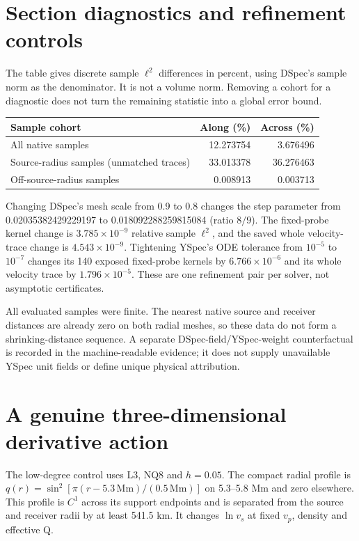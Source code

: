\documentclass[11pt,a4paper]{article}
\begin{document}
\section{Section diagnostics and refinement controls}
The table gives discrete sample $\ell^2$ differences in percent, using DSpec's sample norm as the denominator. It is not a volume norm. Removing a cohort for a diagnostic does not turn the remaining statistic into a global error bound.
\begin{center}\begin{tabular}{lrr}\toprule
Sample cohort & Along (\%) & Across (\%) \\\midrule
All native samples & 12.273754 & 3.676496 \\
Source-radius samples (unmatched traces) & 33.013378 & 36.276463 \\
Off-source-radius samples & 0.008913 & 0.003713 \\
\bottomrule\end{tabular}\end{center}
Changing DSpec's mesh scale from 0.9 to 0.8 changes the step parameter from 0.02035382429229197 to 0.018092288259815084 (ratio $8/9$). The fixed-probe kernel change is $3.785\times10^{-9}$ relative sample $\ell^2$, and the saved whole velocity-trace change is $4.543\times10^{-9}$. Tightening YSpec's ODE tolerance from $10^{-5}$ to $10^{-7}$ changes its 140 exposed fixed-probe kernels by $6.766\times10^{-6}$ and its whole velocity trace by $1.796\times10^{-5}$. These are one refinement pair per solver, not asymptotic certificates.

All evaluated samples were finite. The nearest native source and receiver distances are already zero on both radial meshes, so these data do not form a shrinking-distance sequence. A separate DSpec-field/YSpec-weight counterfactual is recorded in the machine-readable evidence; it does not supply unavailable YSpec unit fields or define unique physical attribution.

\section{A genuine three-dimensional derivative action}
The low-degree control uses L3, NQ8 and $h=0.05$. The compact radial profile is $q(r)=\sin^2[\pi(r-5.3\,\mathrm{Mm})/(0.5\,\mathrm{Mm})]$ on 5.3--5.8 Mm and zero elsewhere. This profile is $C^1$ across its support endpoints and is separated from the source and receiver radii by at least 541.5 km. It changes $\ln v_s$ at fixed $v_p$, density and effective Q.
\end{document}
